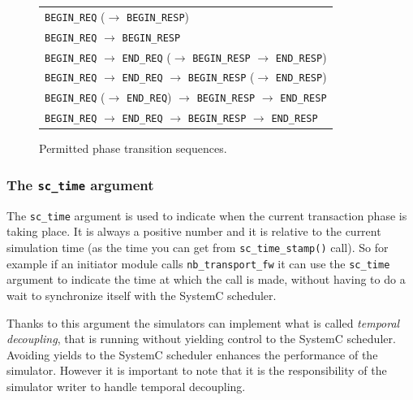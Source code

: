 {\begin{figure}[h]
	\begin{center}
\begin{tabular}{|l|}
\hline
\texttt{BEGIN\_REQ} {\footnotesize($\to$ \texttt{BEGIN\_RESP})}\\
\texttt{BEGIN\_REQ} $\to$ \texttt{BEGIN\_RESP}\\
\texttt{BEGIN\_REQ} $\to$ \texttt{END\_REQ} {\footnotesize($\to$ \texttt{BEGIN\_RESP} $\to$ \texttt{END\_RESP})}\\
\texttt{BEGIN\_REQ} $\to$ \texttt{END\_REQ} $\to$ \texttt{BEGIN\_RESP} {\footnotesize($\to$ \texttt{END\_RESP})}\\
\texttt{BEGIN\_REQ} {\small($\to$ \texttt{END\_REQ})} $\to$ \texttt{BEGIN\_RESP} $\to$ \texttt{END\_RESP}\\
\texttt{BEGIN\_REQ} $\to$ \texttt{END\_REQ} $\to$ \texttt{BEGIN\_RESP} $\to$ \texttt{END\_RESP}\\
\hline
\end{tabular}
	\end{center}
	\caption{Permitted phase transition sequences.}
	\label{fig:tlm_phase_sequences}
\end{figure}

\subsubsection{The \texttt{sc\_time} argument}
The \texttt{sc\_time} argument is used to indicate when the current transaction phase is taking place.
It is always a positive number and it is relative to the current simulation time (as the time you can get from \texttt{sc\_time\_stamp()} call). 
So for example if an initiator module calls \texttt{nb\_transport\_fw} it can use the \texttt{sc\_time} argument to indicate the time at which the call is made, without having to do a wait to synchronize itself with the SystemC scheduler.

Thanks to this argument the simulators can implement what is called \emph{temporal decoupling}, that is running without yielding control to the SystemC scheduler.
Avoiding yields to the SystemC scheduler enhances the performance of the simulator.
However it is important to note that it is the responsibility of the simulator writer to handle temporal decoupling.

}
